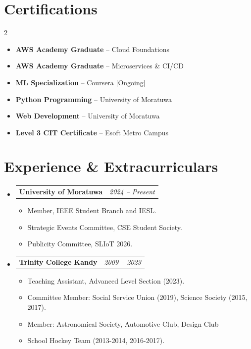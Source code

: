 \documentclass[a4paper,10pt]{article}
\makeatletter
\newcommand{\resumeItem}[1]{\item\small{#1}}
\newcommand{\resumeProjectHeading}[2]{
  \vspace{-1pt}\item
    \begin{tabular*}{0.97\textwidth}{l@{\extracolsep{\fill}}r}
      \textbf{#1} & \textit{\small #2} \\
    \end{tabular*}\vspace{-5pt}
}
\makeatother
\begin{document}
\section{Certifications}
\begin{multicols}{2}
\begin{itemize}[leftmargin=0.15in, label={\tiny$\bullet$}, itemsep=2pt, topsep=2pt]
    \resumeItem{\textbf{AWS Academy Graduate} -- Cloud Foundations}
    \resumeItem{\textbf{AWS Academy Graduate} -- Microservices \& CI/CD}
    \resumeItem{\textbf{ML Specialization} -- Coursera [Ongoing]}
    \resumeItem{\textbf{Python Programming} -- University of Moratuwa}
    \resumeItem{\textbf{Web Development} -- University of Moratuwa}
    \resumeItem{\textbf{Level 3 CIT Certificate} -- Esoft Metro Campus}
\end{itemize}
\end{multicols}

\section{Experience \& Extracurriculars}
\begin{itemize}[leftmargin=0.15in, label={}, itemsep=0pt, topsep=2pt]
    \resumeProjectHeading
      {University of Moratuwa}{2024 -- Present}
      \begin{itemize}[leftmargin=0.15in, label={\tiny$\bullet$}, itemsep=0pt, topsep=1pt]
        \resumeItem{Member, IEEE Student Branch and IESL.}
        \resumeItem{Strategic Events Committee, CSE Student Society.}
        \resumeItem{Publicity Committee, SLIoT 2026.}
      \end{itemize}

    \resumeProjectHeading
      {Trinity College Kandy}{2009 -- 2023}
      \begin{itemize}[leftmargin=0.15in, label={\tiny$\bullet$}, itemsep=0pt, topsep=1pt]
        \resumeItem{Teaching Assistant, Advanced Level Section (2023).}
        \resumeItem{Committee Member: Social Service Union (2019), Science Society (2015, 2017).}
        \resumeItem{Member: Astronomical Society, Automotive Club, Design Club}
        \resumeItem{School Hockey Team (2013-2014, 2016-2017).}
      \end{itemize}
\end{itemize}
\end{document}
